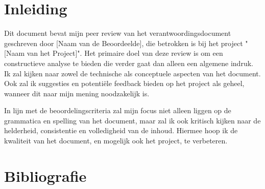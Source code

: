 \documentclass[a4paper]{report}
\begin{document}
\tableofcontents

\chapter{Inleiding}
Dit document bevat mijn peer review van het verantwoordingsdocument geschreven door [Naam van de Beoordeelde], die betrokken is bij het project "[Naam van het Project]". 
Het primaire doel van deze review is om een constructieve analyse te bieden die verder gaat dan alleen een algemene indruk. 
Ik zal kijken naar zowel de technische als conceptuele aspecten van het document. Ook zal ik suggesties en potentiële feedback bieden op het project als geheel, wanneer dit naar mijn mening noodzakelijk is.
\par \smallskip
In lijn met de beoordelingscriteria zal mijn focus niet alleen liggen op de grammatica en spelling van het document, maar zal ik ook kritisch kijken naar de helderheid, consistentie en volledigheid van de inhoud.
Hiermee hoop ik de kwaliteit van het document, en mogelijk ook het project, te verbeteren.


\chapter{Bibliografie}
\begingroup
\renewcommand{\chapter}[2]{} %
\renewcommand{\addcontentsline}[3]{} %


\endgroup

\end{document}
